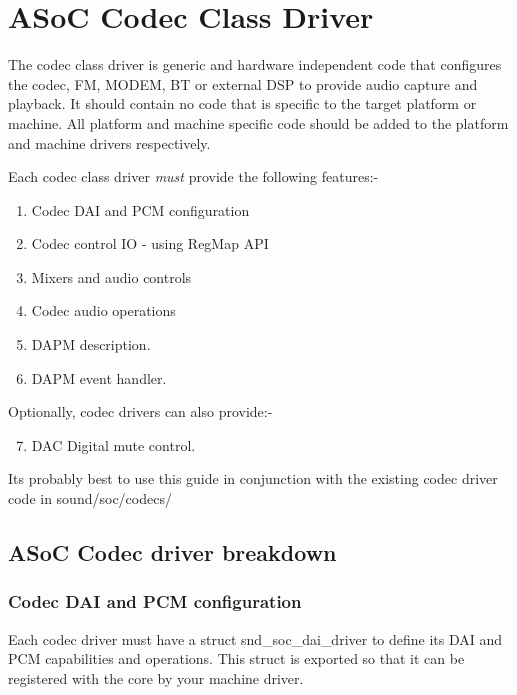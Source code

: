 \documentclass[a4paper,8pt,english]{sphinxmanual}
\begin{document}
\section{ASoC Codec Class Driver}
\label{sound/soc/codec:asoc-codec-class-driver}\label{sound/soc/codec::doc}
The codec class driver is generic and hardware independent code that configures
the codec, FM, MODEM, BT or external DSP to provide audio capture and playback.
It should contain no code that is specific to the target platform or machine.
All platform and machine specific code should be added to the platform and
machine drivers respectively.

Each codec class driver \emph{must} provide the following features:-
\begin{enumerate}
\item {} 
Codec DAI and PCM configuration

\item {} 
Codec control IO - using RegMap API

\item {} 
Mixers and audio controls

\item {} 
Codec audio operations

\item {} 
DAPM description.

\item {} 
DAPM event handler.

\end{enumerate}

Optionally, codec drivers can also provide:-
\begin{enumerate}
\setcounter{enumi}{6}
\item {} 
DAC Digital mute control.

\end{enumerate}

Its probably best to use this guide in conjunction with the existing codec
driver code in sound/soc/codecs/


\subsection{ASoC Codec driver breakdown}
\label{sound/soc/codec:asoc-codec-driver-breakdown}

\subsubsection{Codec DAI and PCM configuration}
\label{sound/soc/codec:codec-dai-and-pcm-configuration}
Each codec driver must have a struct snd\_soc\_dai\_driver to define its DAI and
PCM capabilities and operations. This struct is exported so that it can be
registered with the core by your machine driver.
\end{document}
